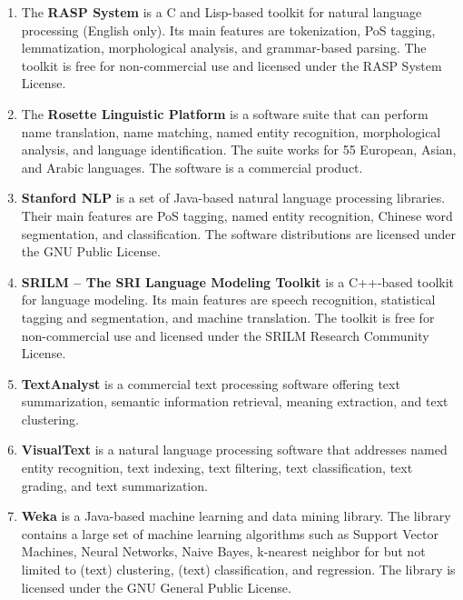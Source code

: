 \begin{enumerate}
	\item The \textbf{RASP System} \cite{briscoe2006second} is a C and Lisp-based toolkit for natural language processing (English only). Its main features are tokenization, PoS tagging, lemmatization, morphological analysis, and grammar-based parsing.
The toolkit is free for non-commercial use and licensed under the RASP System License.

	\item The \textbf{Rosette Linguistic Platform} \cite{rosette} is a software suite that can perform name translation, name matching, named entity recognition, morphological analysis, and language identification. The suite works for 55 European, Asian, and Arabic languages.
The software is a commercial product.

	\item \textbf{Stanford NLP} \cite{stanfordnlp} is a set of Java-based natural language processing libraries. Their main features are PoS tagging, named entity recognition, Chinese word segmentation, and classification.
The software distributions are licensed under the GNU Public License.

	\item \textbf{SRILM -- The SRI Language Modeling Toolkit} \cite{stolcke2002srilm} is a C++-based toolkit for language modeling. Its main features are speech recognition, statistical tagging and segmentation, and machine translation.
The toolkit is free for non-commercial use and licensed under the SRILM Research Community License.

	\item \textbf{TextAnalyst} \cite{textanalyst} is a commercial text processing software offering text summarization, semantic information retrieval, meaning extraction, and text clustering.

	\item \textbf{VisualText} \cite{visualtext} is a natural language processing software that addresses named entity recognition, text indexing, text filtering, text classification, text grading, and text summarization.

	\item \textbf{Weka} \cite{hall2009weka} is a Java-based machine learning and data mining library. The library contains a large set of machine learning algorithms such as Support Vector Machines, Neural Networks, Naive Bayes, k-nearest neighbor for but not limited to (text) clustering, (text) classification, and regression.
The library is licensed under the GNU General Public License.

\end{enumerate}
